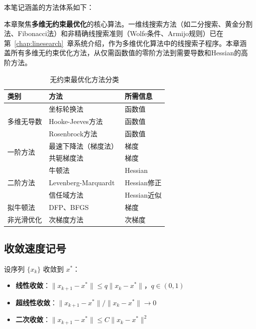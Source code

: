 本笔记涵盖的方法体系如下：

\begin{notebox}[关于方法分类]
本章聚焦\textbf{多维无约束最优化}的核心算法。一维线搜索方法（如二分搜索、黄金分割法、Fibonacci法）和非精确线搜索准则（Wolfe条件、Armijo规则）已在第~\ref{chap:linesearch}~章系统介绍，作为多维优化算法中的线搜索子程序。本章涵盖所有多维无约束优化方法，从仅需函数值的零阶方法到需要导数和Hessian的高阶方法。
\end{notebox}

\begin{table}[H]
\centering
\caption{无约束最优化方法分类}
\begin{tabular}{@{}lll@{}}
\toprule
\textbf{类别} & \textbf{方法} & \textbf{所需信息} \\
\midrule
\multirow{3}{*}{多维无导数}
 & 坐标轮换法 & 函数值 \\
 & Hooke-Jeeves方法 & 函数值 \\
 & Rosenbrock方法 & 函数值 \\
\midrule
\multirow{2}{*}{一阶方法} 
 & 最速下降法（梯度法） & 梯度 \\
 & 共轭梯度法 & 梯度 \\
\midrule
\multirow{3}{*}{二阶方法} 
 & 牛顿法 & Hessian \\
 & Levenberg-Marquardt & Hessian修正 \\
 & 信任域方法 & Hessian近似 \\
\midrule
拟牛顿法 & DFP、BFGS & 梯度 \\
\midrule
非光滑优化 & 次梯度方法 & 次梯度 \\
\bottomrule
\end{tabular}
\end{table}

\subsection{收敛速度记号}

\begin{definition}[收敛速度]
设序列 $\{x_k\}$ 收敛到 $x^*$：
\begin{itemize}
    \item \textbf{线性收敛}：$\|x_{k+1} - x^*\| \leq q \|x_k - x^*\|$，$q \in (0,1)$
    \item \textbf{超线性收敛}：$\|x_{k+1} - x^*\| / \|x_k - x^*\| \to 0$
    \item \textbf{二次收敛}：$\|x_{k+1} - x^*\| \leq C \|x_k - x^*\|^2$
\end{itemize}
\end{definition}

